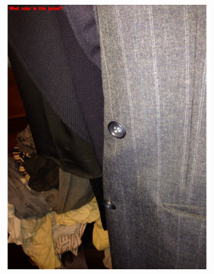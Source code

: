 \documentclass[sigconf]{acmart}
\begin{document}
\begin{figure}[hbp]
\begin{subfigure}[b]{0.3\columnwidth}
                \includegraphics[width=\textwidth]{images/color_2.pdf}  
        \end{subfigure}%
        \begin{subfigure}[b]{0.3\columnwidth}

\end{subfigure}
\end{figure}
\end{document}
